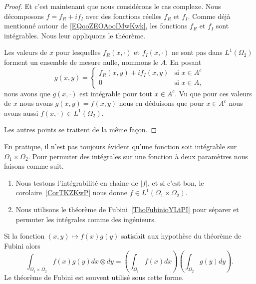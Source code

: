 \begin{proof}
    Et c'est maintenant que nous considérons le cas complexe. Nous décomposons \( f=f_R+if_I\) avec des fonctions réelles \( f_R\) et \( f_I\). Comme déjà mentionné autour de \eqref{EQooZEOAooIMwKwk}, les fonctions \( f_R\) et \( f_I\) sont intégrables. Nous leur appliquons le théorème.

    Les valeurs de \( x\) pour lesquelles \( f_R(x,\cdot)\) et \( f_I(x,\cdot)\) ne sont pas dans \( L^1(\Omega_2)\) forment un ensemble de mesure nulle, nommons le \( A\). En posant
    \begin{equation}
        g(x,y)=\begin{cases}
            f_R(x,y)+if_I(x,y)    &   \text{si } x\in A^c\\
            0    &    \text{si } x\in A,
        \end{cases}
    \end{equation}
    nous avons que \( g(x,\cdot)\) est intégrable pour tout \( x\in A^c\). Vu que pour ces valeurs de \( x\) nous avons \( g(x,y)=f(x,y)\) nous en déduisons que pour \( x\in A^c\) nous avons aussi \( f(x,\cdot)\in L^1(\Omega_2)\).

    Les autres points se traitent de la même façon.
\end{proof}

\begin{normaltext}      \label{NORMooKIRJooPvyPWQ}
    En pratique, il n'est pas toujours évident qu'une fonction soit intégrable sur \( \Omega_1\times \Omega_2\). Pour permuter des intégrales sur une fonction à deux paramètres nous faisons comme suit.
    \begin{enumerate}
        \item
            Nous testons l'intégrabilité en chaine de \( | f |\), et si c'est bon, le corolaire~\ref{CorTKZKwP} nous donne \( f\in L^1(\Omega_1\times \Omega_2)\).
        \item
            Nous utilisons le théorème de Fubini~\ref{ThoFubinioYLtPI} pour séparer et permuter les intégrales comme des ingénieurs.
    \end{enumerate}

    Si la fonction \( (x,y)\mapsto f(x)g(y)\) satisfait aux hypothèse du théorème de Fubini alors
    \begin{equation}    \label{EqTJEEsJW}
        \int_{\Omega_1\times \Omega_2} f(x)g(y)dx\otimes dy=\left( \int_{\Omega_1}f(x)dx \right)\left( \int_{\Omega_2}g(y)dy \right).
    \end{equation}
    Le théorème de Fubini est souvent utilisé sous cette forme.

\end{normaltext}

